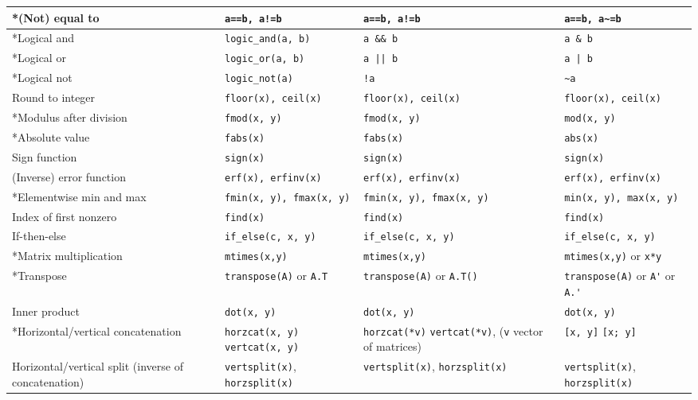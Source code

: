 \documentclass[a4paper,12pt]{book}
\begin{document}
\begin{center}
\begin{tabular}{| p{3.5cm} | p{3.5cm} | p{3.5cm} | p{3.5cm} | }
    *(Not) equal to & \verb|a==b, a!=b| & \verb|a==b, a!=b| & \verb|a==b, a~=b| \\ \hline
    *Logical and & \verb|logic_and(a, b)| &\verb|a && b| &  \verb|a & b| \\ \hline
    *Logical or  & \verb|logic_or(a, b)| & \verb=a || b= & \verb=a | b= \\ \hline
    *Logical not & \verb|logic_not(a)| & \verb|!a| & \verb|~a| \\ \hline
    Round to integer
    & \verb|floor(x), ceil(x)| & \verb|floor(x), ceil(x)| & \verb|floor(x), ceil(x)| \\ \hline
    *Modulus after division
    & \verb|fmod(x, y)| & \verb|fmod(x, y)| & \verb|mod(x, y)| \\ \hline
    *Absolute value
    & \verb|fabs(x)| & \verb|fabs(x)| & \verb|abs(x)| \\ \hline
    Sign function
    & \verb|sign(x)| & \verb|sign(x)| & \verb|sign(x)| \\ \hline
    (Inverse) error function
    & \verb|erf(x), erfinv(x)| & \verb|erf(x), erfinv(x)| & \verb|erf(x), erfinv(x)| \\ \hline
    *Elementwise min and max
    & \verb|fmin(x, y), fmax(x, y)| & \verb|fmin(x, y), fmax(x, y)| & \verb|min(x, y), max(x, y)| \\ \hline
    Index of first nonzero
    & \verb|find(x)| & \verb|find(x)| & \verb|find(x)| \\ \hline
    If-then-else
    & \verb|if_else(c, x, y)| & \verb|if_else(c, x, y)| & \verb|if_else(c, x, y)| \\ \hline
    *Matrix multiplication
    & \verb|mtimes(x,y)| & \verb|mtimes(x,y)| & \verb|mtimes(x,y)| or \verb|x*y| \\ \hline
    *Transpose
    & \verb|transpose(A)| or \verb|A.T| & \verb|transpose(A)| or \verb|A.T()|& \verb|transpose(A)| or \verb|A'| or \verb|A.'| \\ \hline
    Inner product
    & \verb|dot(x, y)| & \verb|dot(x, y)| & \verb|dot(x, y)| \\ \hline
    *Horizontal/vertical concatenation
    & \verb|horzcat(x, y)| \linebreak \verb|vertcat(x, y)|
    & \verb|horzcat(*v)| \verb|vertcat(*v)|, \linebreak (\verb|v| vector of matrices)
    & \verb|[x, y]| \linebreak \verb|[x; y]| \\ \hline
    Horizontal/vertical split (inverse of concatenation)
    & \verb|vertsplit(x)|, \verb|horzsplit(x)| & \verb|vertsplit(x)|, \verb|horzsplit(x)| & \verb|vertsplit(x)|, \verb|horzsplit(x)| \\ \hline

\end{tabular}
\end{center}
\end{document}
